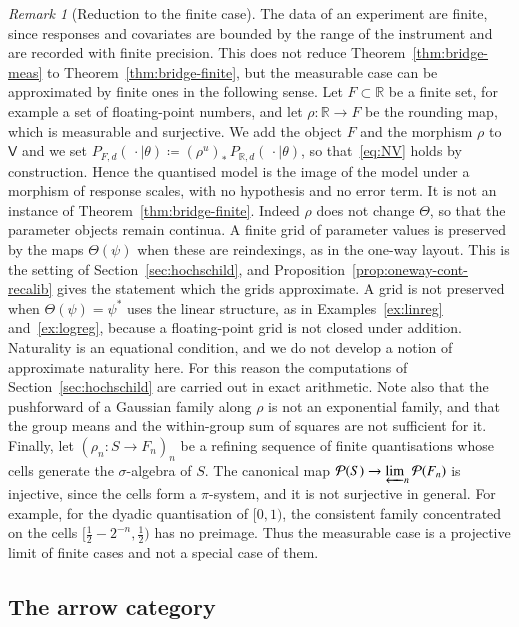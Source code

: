 \documentclass[11pt,a4paper]{article}
\theoremstyle{plain}
\theoremstyle{definition}
\theoremstyle{remark}
\newtheorem{remark}[theorem]{Remark}
\newcommand{\cat}[1]{\mathsf{#1}}
\newcommand{\catV}{\cat{V}}
\newcommand{\Prb}{\mathcal{P}}
\newcommand{\R}{\mathbb{R}}
\begin{document}
\begin{remark}[Reduction to the finite case]\label{rem:reduction}
The data of an experiment are finite, since responses and covariates are
bounded by the range of the instrument and are recorded with finite precision.
This does not reduce Theorem~\ref{thm:bridge-meas} to
Theorem~\ref{thm:bridge-finite}, but the measurable case can be approximated by
finite ones in the following sense. Let $F \subset \R$ be a finite set, for
example a set of floating-point numbers, and let $\rho \colon \R \to F$ be the
rounding map, which is measurable and surjective. We add the object $F$ and the
morphism $\rho$ to $\catV$ and we set
$P_{F,d}(\,\cdot \mid \theta) \coloneqq (\rho^{u})_{*}\,P_{\R,d}(\,\cdot \mid
\theta)$, so that~\eqref{eq:NV} holds by construction. Hence the quantised
model is the image of the model under a morphism of response scales, with no
hypothesis and no error term. It is not an instance of
Theorem~\ref{thm:bridge-finite}. Indeed $\rho$ does not change $\Theta$, so
that the parameter objects remain continua. A finite grid of parameter values
is preserved by the maps $\Theta(\psi)$ when these are reindexings, as in the
one-way layout. This is the setting of Section~\ref{sec:hochschild}, and
Proposition~\ref{prop:oneway-cont-recalib} gives the statement which the grids
approximate. A grid is not preserved when $\Theta(\psi) = \psi^{*}$ uses the
linear structure, as in Examples~\ref{ex:linreg} and~\ref{ex:logreg}, because a
floating-point grid is not closed under addition. Naturality is an equational
condition, and we do not develop a notion of approximate naturality here. For
this reason the computations of Section~\ref{sec:hochschild} are carried out in
exact arithmetic. Note also that the pushforward of a Gaussian family along
$\rho$ is not an exponential family, and that the group means and the
within-group sum of squares are not sufficient for it. Finally, let
$(\rho_n \colon S \to F_n)_{n}$ be a refining sequence of finite quantisations
whose cells generate the $\sigma$-algebra of $S$. The canonical map
$\Prb(S) \to \varprojlim_n \Prb(F_n)$ is injective, since the cells form a
$\pi$-system, and it is not surjective in general. For example, for the dyadic
quantisation of $[0,1)$, the consistent family concentrated on the cells
$[\tfrac12 - 2^{-n}, \tfrac12)$ has no preimage. Thus the measurable case is a
projective limit of finite cases and not a special case of them.
\end{remark}

\subsection{The arrow category}
\end{document}
